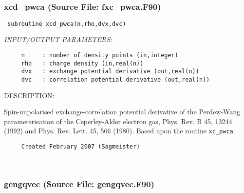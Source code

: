 \documentclass[11pt]{article}
\begin{document}
 
 
\mbox{}\hrulefill\ 
 
\subsubsection{xcd\_pwca (Source File: fxc\_pwca.F90)}


\begin{verbatim} subroutine xcd_pwca(n,rho,dvx,dvc)\end{verbatim}{\em INPUT/OUTPUT PARAMETERS:}
\begin{verbatim}     n     : number of density points (in,integer)
     rho   : charge density (in,real(n))
     dvx   : exchange potential derivative (out,real(n))
     dvc   : correlation potential derivative (out,real(n))\end{verbatim}
{\sf DESCRIPTION:\\ }


     Spin-unpolarised exchange-correlation potential derivative of the 
     Perdew-Wang
     parameterisation of the Ceperley-Alder electron gas,
     Phys. Rev. B 45, 13244
     (1992) and Phys. Rev. Lett. 45, 566 (1980). Based upon the routine
     {\tt xc\_pwca}.
  
\begin{verbatim}     Created February 2007 (Sagmeister)\end{verbatim}








 
 
\mbox{}\hrulefill\ 
 
\subsubsection{gengqvec (Source File: gengqvec.F90)}
\end{document}
